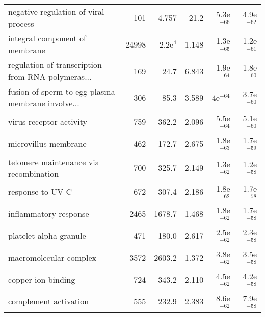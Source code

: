 \begin{longtable}{lrrrrr}
              negative regulation of viral process &                     101 &                   4.757 &       21.2 &         5.3e$^{-66}$ &         4.9e$^{-62}$ \\
                    integral component of membrane &                   24998 &              2.2e$^{4}$ &      1.148 &         1.3e$^{-65}$ &         1.2e$^{-61}$ \\
 regulation of transcription from RNA polymeras... &                     169 &                    24.7 &      6.843 &         1.9e$^{-64}$ &         1.8e$^{-60}$ \\
 fusion of sperm to egg plasma membrane involve... &                     306 &                    85.3 &      3.589 &           4e$^{-64}$ &         3.7e$^{-60}$ \\
                           virus receptor activity &                     759 &                   362.2 &      2.096 &         5.5e$^{-64}$ &         5.1e$^{-60}$ \\
                              microvillus membrane &                     462 &                   172.7 &      2.675 &         1.8e$^{-63}$ &         1.7e$^{-59}$ \\
            telomere maintenance via recombination &                     700 &                   325.7 &      2.149 &         1.3e$^{-62}$ &         1.2e$^{-58}$ \\
                                  response to UV-C &                     672 &                   307.4 &      2.186 &         1.8e$^{-62}$ &         1.7e$^{-58}$ \\
                             inflammatory response &                    2465 &                  1678.7 &      1.468 &         1.8e$^{-62}$ &         1.7e$^{-58}$ \\
                            platelet alpha granule &                     471 &                   180.0 &      2.617 &         2.5e$^{-62}$ &         2.3e$^{-58}$ \\
                            macromolecular complex &                    3572 &                  2603.2 &      1.372 &         3.8e$^{-62}$ &         3.5e$^{-58}$ \\
                                copper ion binding &                     724 &                   343.2 &      2.110 &         4.5e$^{-62}$ &         4.2e$^{-58}$ \\
                             complement activation &                     555 &                   232.9 &      2.383 &         8.6e$^{-62}$ &         7.9e$^{-58}$ \\

\end{longtable}
